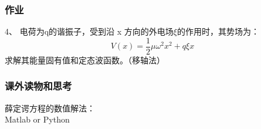 \begin{frame}
	\frametitle{ 作业 }
	4、	电荷为q的谐振子，受到沿 x 方向的外电场$\xi $的作用时，其势场为：
	\begin{equation*}
		V(x)= \frac{1}{2} \mu \omega ^2 x^2  +q\xi x  
	\end{equation*}
	求解其能量固有值和定态波函数。（移轴法）
\end{frame}

\begin{frame}
	\frametitle{课外读物和思考}
	薛定谔方程的数值解法：\\
	Matlab or Python 
\end{frame}	
